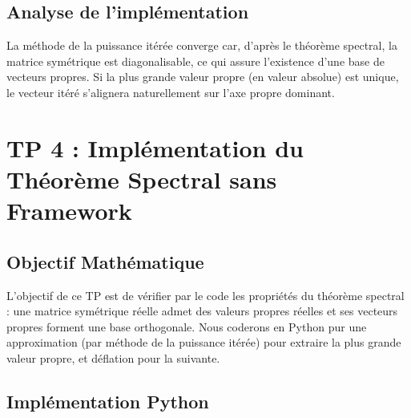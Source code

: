\documentclass[11pt,a4paper]{article}
\begin{document}
\subsection{Analyse de l'implémentation}
La méthode de la puissance itérée converge car, d'après le théorème spectral, la matrice symétrique est diagonalisable, ce qui assure l'existence d'une base de vecteurs propres. Si la plus grande valeur propre (en valeur absolue) est unique, le vecteur itéré s'alignera naturellement sur l'axe propre dominant.

\newpage
\section{TP 4 : Implémentation du Théorème Spectral sans Framework}

\subsection{Objectif Mathématique}
L'objectif de ce TP est de vérifier par le code les propriétés du théorème spectral : une matrice symétrique réelle admet des valeurs propres réelles et ses vecteurs propres forment une base orthogonale. Nous coderons en Python pur une approximation (par méthode de la puissance itérée) pour extraire la plus grande valeur propre, et déflation pour la suivante.

\subsection{Implémentation Python}
\end{document}
